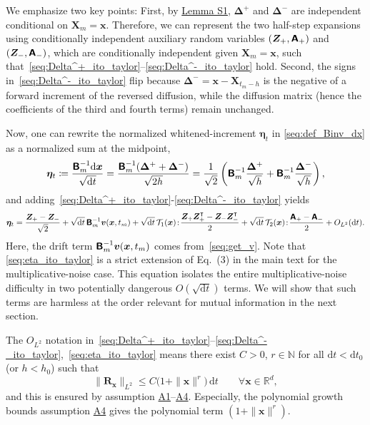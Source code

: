 We emphasize two key points: First, by \hyperlink{lem:S1}{Lemma S1}, $\bm{\Delta}^+$ and $\bm{\Delta}^-$ are independent conditional on $\bm{X}_m=\bm{x}$.
Therefore, we can represent the two half-step expansions using conditionally independent auxiliary random variables $(\bm{Z}_+,\boldsymbol{\mathsf{A}}_+)$ and $(\bm{Z}_-,\boldsymbol{\mathsf{A}}_-)$, which are conditionally independent given $\bm{X}_m=\bm{x}$, such that~\eqref{seq:Delta^+_ito_taylor}--\eqref{seq:Delta^-_ito_taylor} hold.
Second, the signs in~\eqref{seq:Delta^-_ito_taylor} flip because $\bm\Delta^-=\bm{x}-\bm{X}_{t_m-h}$ is the negative of a forward increment of the reversed diffusion, while the diffusion matrix (hence the coefficients of the third and fourth terms) remain unchanged.

Now, one can rewrite the normalized whitened-increment $\bm\eta_t$ in \eqref{seq:def_Binv_dx} as a normalized sum at the midpoint,
\begin{equation}
    \bm\eta_t\coloneq
    \frac{\boldsymbol{\mathsf{B}}_m^{-1}\mathrm{d}\bm{x}}{\sqrt{\mathrm{d}t}}
    =\frac{\boldsymbol{\mathsf{B}}_m^{-1}(\bm\Delta^++\bm\Delta^-)}{\sqrt{2h}}
    =\frac{1}{\sqrt{2}}\left(\boldsymbol{\mathsf{B}}_m^{-1}\frac{\bm\Delta^+}{\sqrt{h}}
    +\boldsymbol{\mathsf{B}}_m^{-1}\frac{\bm\Delta^-}{\sqrt{h}}\right),
    \label{seq:def_midpoint_normalized_sum}
\end{equation}
and adding~\eqref{seq:Delta^+_ito_taylor}-\eqref{seq:Delta^-_ito_taylor} yields
\begin{equation}
    \bm\eta_t
    =\frac{\bm{Z}_+-\bm{Z}_-}{\sqrt{2}}
    +\sqrt{\mathrm{d}t}\,\boldsymbol{\mathsf{B}}_m^{-1}\bm{v}(\bm{x},t_m)
    +\sqrt{\mathrm{d}t}\,\mathcal{T}_1(\bm{x})\!:\!
    \frac{\bm{Z}_+\bm{Z}_+^\intercal-\bm{Z}_-\bm{Z}_-^\intercal}{2}
    +\sqrt{\mathrm{d}t}\,\mathcal{T}_2(\bm{x})\!:\!\frac{
    \boldsymbol{\mathsf{A}}_+-\boldsymbol{\mathsf{A}}_-}{2}
    +O_{L^2}(\mathrm{d}t).
    \label{seq:eta_ito_taylor}
\end{equation}
Here, the drift term $\boldsymbol{\mathsf{B}}_m^{-1}\bm{v}(\bm{x},t_m)$ comes from~\eqref{seq:get_v}. Note that \eqref{seq:eta_ito_taylor} is a strict extension of Eq.~(3) in the main text for the multiplicative-noise case.
This equation isolates the entire multiplicative-noise difficulty in two potentially dangerous $O(\sqrt{\mathrm dt})$ terms. We will show that such terms are harmless at the order relevant for mutual information in the next section.

The $O_{L^2}$ notation in~\eqref{seq:Delta^+_ito_taylor}--\eqref{seq:Delta^-_ito_taylor},~\eqref{seq:eta_ito_taylor} means there exist $C>0$, $r\in\mathbb N$ for all $\mathrm dt<\mathrm dt_0$ (or $h<h_0$) such that
\begin{equation}
    \|\bm R_{\bm x}\|_{L^2}\leq
    C\big(1+\|\bm x\|^r\big)\,\mathrm dt
    \qquad
    \forall\bm x\in \mathbb R^d,
\end{equation}
and this is ensured by assumption \hyperlink{assumption:A1}{A1}--\hyperlink{assumption:A4}{A4}. Especially, the polynomial growth bounds assumption \hyperlink{assumption:A4}{A4} gives the polynomial term $(1+\|\bm x\|^r)$.


